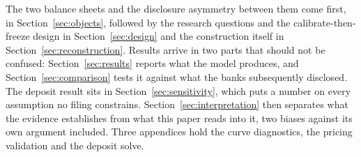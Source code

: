 The two balance sheets and the disclosure asymmetry between them come first, in
Section~\ref{sec:objects}, followed by the research questions and the
calibrate-then-freeze design in Section~\ref{sec:design} and the construction itself
in Section~\ref{sec:reconstruction}. Results arrive in two parts that should not be
confused: Section~\ref{sec:results} reports what the model produces, and
Section~\ref{sec:comparison} tests it against what the banks subsequently disclosed.
The deposit result sits in Section~\ref{sec:sensitivity}, which puts a number on every
assumption no filing constrains. Section~\ref{sec:interpretation} then separates what
the evidence establishes from what this paper reads into it, two biases against its
own argument included. Three appendices hold the curve diagnostics, the pricing
validation and the deposit solve.
